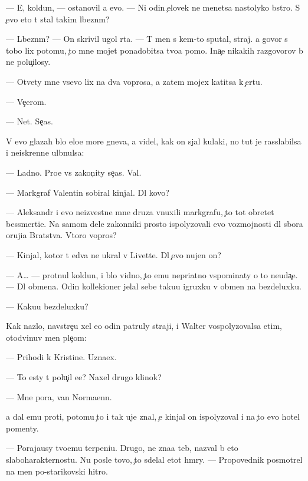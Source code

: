 \documentclass[10pt]{book}
\begin{document}
— E{\y}, koldun, — ostanovil {\y}a {\y}evo. — Ni odin {\c}elovek ne men{\ia}{\y}etsa nastolyko b{\yi}stro. S {\c}evo eto t{\yi} stal takim l{\iu}bezn{\yi}m?

— L{\iu}bezn{\yi}m? — On skrivil ugol rta. — T{\yi} men{\ia} s kem-to sputal, straj. {\Y}a govor{\iu} s tobo{\y} lix potomu, {\c}to mne mojet ponadobitsa tvo{\y}a pomo{\x}. Ina{\c}e nikakih razgovorov b{\yi} ne polu{\c}ilosy.

— Otvety mne vsevo lix na dva voprosa, a zatem mojex katitsa k {\c}ertu.

— Ve{\c}erom.

— Net. Se{\y}{\c}as.

V {\y}evo glazah b{\yi}lo {\q}elo{\y}e more gneva, {\y}a videl, kak on sjal kulaki, no tut je rasslabilsa i ne{\y}iskrenne ul{\yi}bnulsa:

— Ladno. Pro{\x}e vs{\e} zakon{\c}ity se{\y}{\c}as. Val{\ia}{\y}.

— Markgraf Valentin sobiral kinjal{\yi}. Dl{\ia} kovo?

— Aleksandr i {\y}evo ne{\y}izvestn{\yi}{\y}e mne druz{\y}a vnuxili markgrafu, {\c}to tot obretet bessmerti{\y}e. Na samom dele zakonniki prosto ispolyzovali {\y}evo vozmojnosti dl{\ia} sbora oruji{\y}a Bratstva. Vtoro{\y} vopros?

— Kinjal, kotor{\yi}{\y} t{\yi} {\y}edva ne ukral v Livette. Dl{\ia} {\c}evo nujen on?

— A… — prot{\ia}nul koldun, i b{\yi}lo vidno, {\c}to {\y}emu nepri{\y}atno vspominaty o to{\y} neuda{\c}e. — Dl{\ia} obmena. Odin kollek{\q}ioner jelal sebe taku{\y}u igruxku v obmen na bezdeluxku.

— Kaku{\y}u bezdeluxku?

Kak nazlo, navstre{\c}u xel {\y}e{\x}o odin patruly straji, i Walter vospolyzovalsa etim, otodvinuv men{\ia} ple{\c}om:

— Prihodi k Kristine. Uzna{\y}ex.

— To {\y}esty t{\yi} polu{\c}il {\y}e{\y}e? Naxel drugo{\y} klinok?

— Mne pora, van Normaenn.

{\Y}a dal {\y}emu pro{\y}ti, potomu {\c}to i tak uje znal, {\c}e{\y} kinjal on ispolyzoval i na {\c}to {\y}evo hotel pomen{\ia}ty.



— Poraja{\y}usy tvo{\y}emu terpeni{\y}u. Drugo{\y}, ne zna{\y}a teb{\ia}, nazval b{\yi} eto slaboharakternost{\y}u. Nu posle tovo, {\c}to sdelal etot hm{\yi}ry. — Propovednik posmotrel na men{\ia} po-starikovski hitro.
\end{document}
